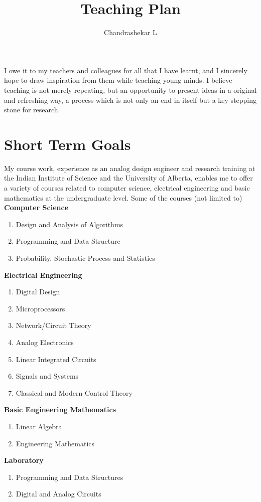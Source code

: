 \documentclass[onecolumn,12pt]{IEEEtran}
\title{\Large Teaching Plan}
\author{Chandrashekar L}
\date{}
\begin{document}
\maketitle
I owe it to my teachers and colleagues for all that I have learnt, and I sincerely hope to draw inspiration from them while teaching young minds. 
I believe teaching is not merely repeating, but an opportunity to present ideas in a original and refreshing way, a process which is not only an end in itself but a key stepping stone for research.\par
\section{Short Term Goals}
My course work, experience as an analog design engineer and research training at the Indian Institute of Science and the University of Alberta, enables me to offer a variety of courses related to computer science, electrical engineering and basic mathematics at the undergraduate level. Some of the courses (not limited to)\\
\textbf{Computer Science} 
\begin{enumerate}
\item Design and Analysis of Algorithms\cite{algo}
\item Programming and Data Structure
\item Probability, Stochastic Process and Statistics\cite{rossbasic}
\end{enumerate}
\textbf{Electrical Engineering}
\begin{enumerate}
\item Digital Design \cite{mano}
\item Microprocessors \cite{mup}
\item Network/Circuit Theory \cite{hayt}
\item Analog Electronics \cite{sedra}
\item Linear Integrated Circuits \cite{franco}
\item Signals and Systems \cite{ss}
\item Classical and Modern Control Theory \cite{ogata} 
\end{enumerate}
\textbf{Basic Engineering Mathematics}
\begin{enumerate}
\item Linear Algebra \cite{la}
\item Engineering Mathematics \cite{em}
\end{enumerate}
\textbf{Laboratory}
\begin{enumerate}
\item Programming and Data Structures
\item Digital and Analog Circuits
\end{enumerate}
\end{document}
